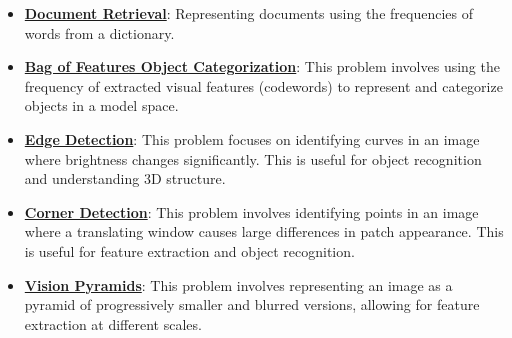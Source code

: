 \documentclass{article}%
\begin{document}
\begin{itemize}[leftmargin=*]
\item \href{https://purdue.brightspace.com/d2l/common/assets/pdfjs-d2l-dist/1.0.14-legacy/web/viewer.html?file=\%2Fcontent\%2Fenforced\%2F1095467-wl.202510.CS.24300.001\%2F07L2-Vision.pdf\%3Fou\%3D1095467\&lang=en-us\&container=d2l-fileviewer-rendered-pdf\&fullscreen=d2l-fileviewer-rendered-pdf-dialog\&height=667#page=20}{\textbf{Document Retrieval}}: Representing documents using the frequencies of words from a dictionary.%
\end{itemize}%
\begin{itemize}[leftmargin=*]%
\item \href{https://purdue.brightspace.com/d2l/common/assets/pdfjs-d2l-dist/1.0.14-legacy/web/viewer.html?file=\%2Fcontent\%2Fenforced\%2F1095467-wl.202510.CS.24300.001\%2F08L2-Feature Extraction.pdf\%3Fou\%3D1095467\&lang=en-us\&container=d2l-fileviewer-rendered-pdf\&fullscreen=d2l-fileviewer-rendered-pdf-dialog\&height=667#page=3}{\textbf{Bag of Features Object Categorization}}: This problem involves using the frequency of extracted visual features (codewords) to represent and categorize objects in a model space.%
\item \href{https://purdue.brightspace.com/d2l/common/assets/pdfjs-d2l-dist/1.0.14-legacy/web/viewer.html?file=\%2Fcontent\%2Fenforced\%2F1095467-wl.202510.CS.24300.001\%2F08L2-Feature Extraction.pdf\%3Fou\%3D1095467\&lang=en-us\&container=d2l-fileviewer-rendered-pdf\&fullscreen=d2l-fileviewer-rendered-pdf-dialog\&height=667#page=4}{\textbf{Edge Detection}}: This problem focuses on identifying curves in an image where brightness changes significantly. This is useful for object recognition and understanding 3D structure.%
\item \href{https://purdue.brightspace.com/d2l/common/assets/pdfjs-d2l-dist/1.0.14-legacy/web/viewer.html?file=\%2Fcontent\%2Fenforced\%2F1095467-wl.202510.CS.24300.001\%2F08L2-Feature Extraction.pdf\%3Fou\%3D1095467\&lang=en-us\&container=d2l-fileviewer-rendered-pdf\&fullscreen=d2l-fileviewer-rendered-pdf-dialog\&height=667#page=20}{\textbf{Corner Detection}}: This problem involves identifying points in an image where a translating window causes large differences in patch appearance. This is useful for feature extraction and object recognition.%
\item \href{https://purdue.brightspace.com/d2l/common/assets/pdfjs-d2l-dist/1.0.14-legacy/web/viewer.html?file=\%2Fcontent\%2Fenforced\%2F1095467-wl.202510.CS.24300.001\%2F08L2-Feature Extraction.pdf\%3Fou\%3D1095467\&lang=en-us\&container=d2l-fileviewer-rendered-pdf\&fullscreen=d2l-fileviewer-rendered-pdf-dialog\&height=667#page=30}{\textbf{Vision Pyramids}}: This problem involves representing an image as a pyramid of progressively smaller and blurred versions, allowing for feature extraction at different scales.%
\end{itemize}%
\end{document}
